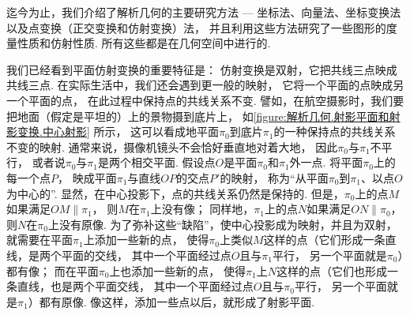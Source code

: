 迄今为止，我们介绍了解析几何的主要研究方法
--- 坐标法、向量法、坐标变换法以及点变换（正交变换和仿射变换）法，
并且利用这些方法研究了一些图形的度量性质和仿射性质.
所有这些都是在几何空间中进行的.

我们已经看到平面仿射变换的重要特征是：
仿射变换是双射，它把共线三点映成共线三点.
在实际生活中，我们还会遇到更一般的映射，
它将一个平面的点映成另一个平面的点，
在此过程中保持点的共线关系不变.
譬如，在航空摄影时，我们要把地面（假定是平坦的）上的景物摄到底片上，
如\cref{figure:解析几何.射影平面和射影变换.中心射影} 所示，
这可以看成地平面\(\pi_0\)到底片\(\pi_1\)的一种保持点的共线关系不变的映射.
通常来说，摄像机镜头不会恰好垂直地对着大地，
因此\(\pi_0\)与\(\pi_1\)不平行，
或者说\(\pi_0\)与\(\pi_1\)是两个相交平面.
假设点\(O\)是平面\(\pi_0\)和\(\pi_1\)外一点.
将平面\(\pi_0\)上的每一个点\(P\)，
映成平面\(\pi_1\)与直线\(OP\)的交点\(P'\)的映射，
称为“从平面\(\pi_0\)到\(\pi_1\)、以点\(O\)为中心的”.
显然，在中心投影下，点的共线关系仍然是保持的.
但是，\(\pi_0\)上的点\(M\)如果满足\(OM \parallel \pi_1\)，
则\(M\)在\(\pi_1\)上没有像；
同样地，\(\pi_1\)上的点\(N\)如果满足\(ON \parallel \pi_0\)，
则\(N\)在\(\pi_0\)上没有原像.
为了弥补这些“缺陷”，使中心投影成为映射，并且为双射，
就需要在平面\(\pi_1\)上添加一些新的点，
使得\(\pi_0\)上类似\(M\)这样的点（它们形成一条直线，是两个平面的交线，
其中一个平面经过点\(O\)且与\(\pi_1\)平行，
另一个平面就是\(\pi_0\)）都有像；
而在平面\(\pi_0\)上也添加一些新的点，
使得\(\pi_1\)上\(N\)这样的点（它们也形成一条直线，也是两个平面交线，
其中一个平面经过点\(O\)且与\(\pi_0\)平行，
另一个平面就是\(\pi_1\)）都有原像.
像这样，添加一些点以后，就形成了射影平面.

